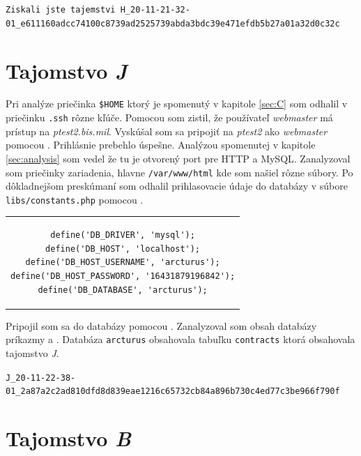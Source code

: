 \documentclass[11pt,a4paper]{article}
\begin{document}
\begin{center}
\small{\texttt{Ziskali jste tajemstvi H\_20-11-21-32-01\_e611160adcc74100c8739ad2525739abda3bdc39e471efdb5b27a01a32d0c32c}}
\end{center}

\section{Tajomstvo \textit{J}}\label{sec:J}

Pri analýze priečinka \texttt{\$HOME} ktorý je spomenutý v kapitole \ref{sec:C} som odhalil v priečinku \texttt{.ssh} rôzne kľúče. Pomocou  som zistil, že používateľ \textit{webmaster} má prístup na \textit{ptest2.bis.mil}. Vyskúšal som sa pripojiť na \textit{ptest2} ako \textit{webmaster} pomocou . Prihlásnie prebehlo úspešne. Analýzou spomenutej v kapitole \ref{sec:analysis} som vedel že tu je otvorený port pre HTTP a MySQL. Zanalyzoval som priečinky zariadenia, hlavne \texttt{/var/www/html} kde som našiel rôzne súbory. Po dôkladnejšom preskúmaní som odhalil prihlasovacie údaje do databázy v súbore \texttt{libs/constants.php} pomocou .

\begin{center}
\begin{tabular}{c}
\begin{lstlisting}[basicstyle=\footnotesize]
define('DB_DRIVER', 'mysql');
define('DB_HOST', 'localhost');
define('DB_HOST_USERNAME', 'arcturus');
define('DB_HOST_PASSWORD', '16431879196842');
define('DB_DATABASE', 'arcturus');
\end{lstlisting}
\end{tabular}
\end{center}

 Pripojil som sa do databázy pomocou . Zanalyzoval som obsah databázy príkazmy  a . Databáza \texttt{arcturus} obsahovala tabuľku \texttt{contracts} ktorá obsahovala tajomstvo \textit{J}.

\begin{center}
\small{\texttt{J\_20-11-22-38-01\_2a87a2c2ad810dfd8d839eae1216c65732cb84a896b730c4ed77c3be966f790f}}
\end{center}


\section{Tajomstvo \textit{B}}\label{sec:B}





%
%    
\end{document}
